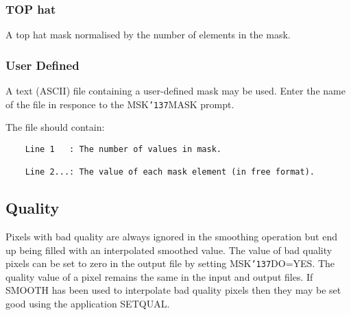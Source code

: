 \documentclass{book}
\renewcommand{\_}{{\tt\char'137}}     %
\begin{document}
\subsubsection{TOP hat}
A top hat mask normalised by the number of elements in the mask.

\subsubsection{User Defined}
A text (ASCII) file containing a user-defined mask may be used.
Enter the name of the file in responce to the MSK\_MASK prompt.

The file should contain:
\begin{verbatim}
    Line 1   : The number of values in mask.

    Line 2...: The value of each mask element (in free format).
\end{verbatim}
\subsection{Quality}
Pixels with bad quality are always ignored in the smoothing operation
but end up being filled with an interpolated smoothed value. The value
of bad quality pixels can be set to zero in the output file by setting
MSK\_DO=YES. The quality value of a pixel remains the same in the
input and output files. If SMOOTH has been used to interpolate bad
quality pixels then they may be set good using the application
SETQUAL.
\end{document}
